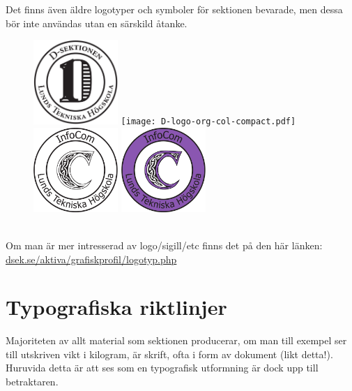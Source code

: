 \documentclass[]{dsekprotokoll}
\begin{document}
Det finns även äldre logotyper och symboler för sektionen bevarade, men dessa bör inte användas utan en särskild åtanke.
\begin{figure}[!hbp]
    \centering
    \includegraphics[height=32mm]{D-logo-org-bw-compact.pdf} \texttt{[image: D-logo-org-col-compact.pdf]} \\
    \includegraphics[height=32mm]{C-logo-org-bw.pdf} \includegraphics[height=32mm]{C-logo-org-col.pdf}
    \label{fig:my_label}
\end{figure}
\\
Om man är mer intresserad av logo/sigill/etc finns det på den här länken: \\
\href{https://www.dsek.se/aktiva/grafiskprofil/logotyp.php}{dsek.se/aktiva/grafiskprofil/logotyp.php}



\section{Typografiska riktlinjer}
Majoriteten av allt material som sektionen producerar, om man till exempel ser till utskriven vikt i kilogram, är skrift, ofta i form av dokument (likt detta!). Huruvida detta är att ses som en typografisk utformning är dock upp till betraktaren.
\end{document}
